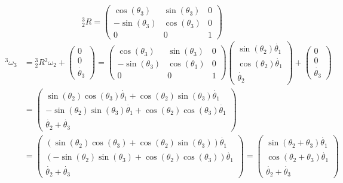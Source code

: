 \documentclass[10pt,a4paper]{article}
\begin{document}
\begin{equation*}
  {}^{3}_{2}R = \begin{pmatrix}
    \cos(\theta_{3}) & \sin(\theta_{3}) & 0\\
    -\sin(\theta_{3}) & \cos(\theta_{3}) & 0\\
    0 & 0 & 1
  \end{pmatrix}
\end{equation*}
\begin{align*}
  {}^{3}\omega_{3} & = {}^{3}_{2}R {}^{2}\omega_{2} + \begin{pmatrix}
    0\\0\\\dot{\theta_{3}}
  \end{pmatrix} = \begin{pmatrix}
    \cos(\theta_{3}) & \sin(\theta_{3}) & 0\\
    -\sin(\theta_{3}) & \cos(\theta_{3}) & 0\\
    0 & 0 & 1
  \end{pmatrix} \begin{pmatrix}
    \sin(\theta_{2})\dot{\theta_{1}} \\ \cos(\theta_{2})\dot{\theta_{1}} \\ \dot{\theta_{2}}
  \end{pmatrix} + \begin{pmatrix}
    0\\0\\\dot{\theta_{3}}
  \end{pmatrix}\\
                   & = \begin{pmatrix}
                     \sin(\theta_{2})\cos(\theta_{3})\dot{\theta_{1}} + \cos(\theta_{2})\sin(\theta_{3})\dot{\theta_{1}}\\
                     -\sin(\theta_{2})\sin(\theta_{3})\dot{\theta_{1}} + \cos(\theta_{2})\cos(\theta_{3})\dot{\theta_{1}}\\
                     \dot{\theta_{2}} + \dot{\theta_{3}}
                   \end{pmatrix}\\
                   & = \begin{pmatrix}
                     \left( \sin(\theta_{2})\cos(\theta_{3}) + \cos(\theta_{2})\sin(\theta_{3}) \right) \dot{\theta_{1}}\\
                     \left( -\sin(\theta_{2})\sin(\theta_{3}) + \cos(\theta_{2})\cos(\theta_{3}) \right) \dot{\theta_{1}}\\
                     \dot{\theta_{2}} + \dot{\theta_{3}}
                   \end{pmatrix} = \begin{pmatrix}
                     \sin(\theta_{2} + \theta_{3}) \dot{\theta_{1}}\\
                     \cos(\theta_{2} + \theta_{3}) \dot{\theta_{1}}\\
                     \dot{\theta_{2}} + \dot{\theta_{3}}
                   \end{pmatrix}
\end{align*}
\end{document}
